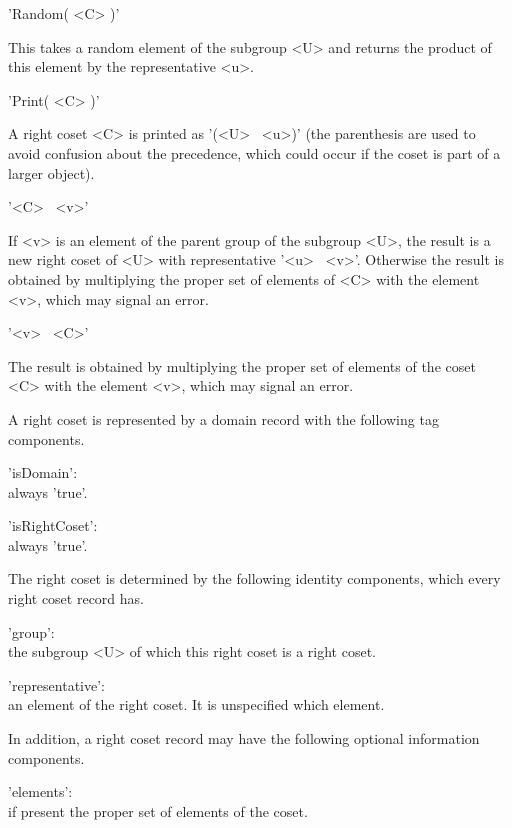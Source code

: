 \vspace{5mm}
'Random( <C> )'%

This takes a random element of  the subgroup <U>  and returns the product
of this element by the representative <u>.

\vspace{5mm}
'Print( <C> )'%

A right coset <C> is printed as '(<U> \*\ <u>)' (the parenthesis are used
to  avoid confusion about the precedence,  which could occur if the coset
is part of a larger object).

\vspace{5mm}
'<C> \*\ <v>'%

If <v> is an element of the parent group of the  subgroup <U>, the result
is a new right coset of <U> with representative '<u> \*\ <v>'.  Otherwise
the result is obtained by multiplying  the proper set  of elements of <C>
with the element <v>, which may signal an error.

\vspace{5mm}
'<v> \*\ <C>'

The result  is obtained by multiplying the  proper set of elements of the
coset <C> with the element <v>, which may signal an error.

%

A right   coset is represented  by   a domain record  with  the following
tag components.

'isDomain': \\
        always 'true'.

'isRightCoset': \\
        always 'true'.

The right coset is determined by the following identity components, which
every right coset record has.

'group': \\
        the subgroup <U> of which this right coset is a right coset.

'representative': \\
        an element of the right coset.  It is unspecified which element.

In   addition,  a right   coset record may    have the following optional
information components.

'elements': \\
        if present the proper set of elements of the coset.

